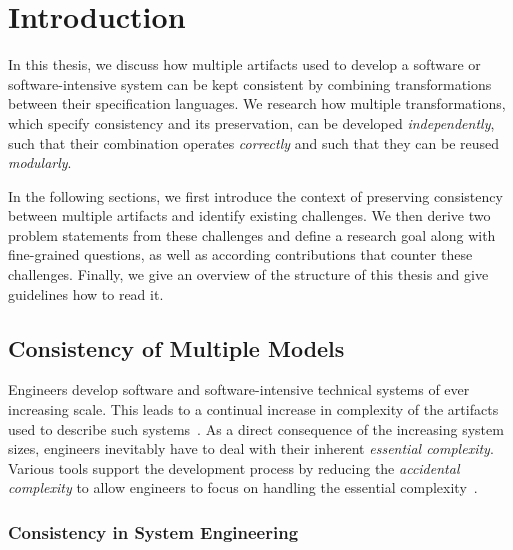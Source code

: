 \chapter{Introduction
}
\label{chap:introduction}

In this thesis, we discuss how multiple artifacts used to develop a software or software-intensive system can be kept consistent by combining transformations between their specification languages.
We research how multiple transformations, which specify consistency and its preservation, can be developed \emph{independently}, such that their combination operates \emph{correctly} and such that they can be reused \emph{modularly}.

In the following sections, we first introduce the context of preserving consistency between multiple artifacts and identify existing challenges. We then derive two problem statements from these challenges and define a research goal along with fine-grained questions, as well as according contributions that counter these challenges.
Finally, we give an overview of the structure of this thesis and give guidelines how to read it.


\section{Consistency of Multiple Models}

Engineers develop software and software-intensive technical systems of ever increasing scale.
This leads to a continual increase in complexity of the artifacts used to describe such systems~\cite{murer2011evolution}.
As a direct consequence of the increasing system sizes, engineers inevitably have to deal with their inherent \emph{essential complexity}.
Various tools support the development process by reducing the \emph{accidental complexity} to allow engineers to focus on handling the essential complexity~\cite{brooks1987NoSilverBullet-Computer, fraser2008NoSilverBulletReloaded-Software}.

\subsection{Consistency in System Engineering}

